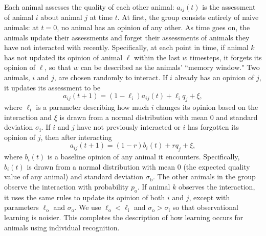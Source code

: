 Each animal assesses the quality of each other animal: $a_{ij}(t)$ is the assessment of animal $i$ about animal $j$ at time $t$.  At first, the group consists entirely of naive animals: at $t=0$, no animal has an opinion of any other. As time goes on, the animals update their assessments and forget their assessments of animals they have not interacted with recently. Specifically, at each point in time, if animal $k$ has not updated its opinion of animal $\ell$ within the last $w$ timesteps, it forgets its opinion of $\ell$, so that $w$ can be described as the animals' ``memory window." Two animals, $i$ and $j$, are chosen randomly to interact. If $i$ already has an opinion of $j$, it updates its assessment to be 
\begin{equation*}
a_{ij}(t+1)=(1-\ell_\text{i})a_{ij}(t)+\ell_\text{i} q_j+\xi,
\end{equation*}
where $\ell_\text{i}$ is a parameter describing how much $i$ changes its opinion based on the interaction and $\xi$ is drawn from a normal distribution with mean $0$ and standard deviation $\sigma_\text{i}$. If $i$ and $j$ have not previously interacted or $i$ has forgotten its opinion of $j$, then after interacting 
\begin{equation*}
a_{ij}(t+1)=(1-r)b_{i}(t)+rq_j+\xi,
\end{equation*}
where $b_i(t)$ is a baseline opinion of any animal it encounters. Specifically, $b_i(t)$ is drawn from a normal distribution with mean $0$ (the expected quality value of any animal) and standard deviation $\sigma_\text{b}$. The other animals in the group observe the interaction with probability $p_\text{o}$. If animal $k$ observes the interaction, it uses the same rules to update its opinion of both $i$ and $j$, except with parameters $\ell_\text{o}$ and $\sigma_\text{o}$. We use $\ell_\text{o}<\ell_\text{i}$ and $\sigma_\text{o}>\sigma_\text{i}$ so that observational learning is noisier. This completes the description of how learning occurs for animals using individual recognition. 

